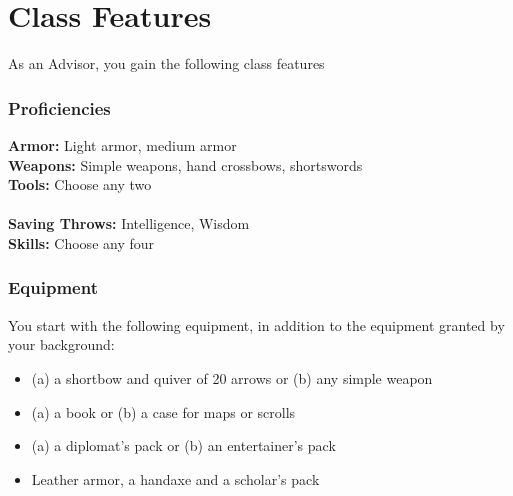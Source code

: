 \documentclass[letterpaper,openany,twoside,twocolumn]{book}
\begin{document}
	
	
	\section*{Class Features}
	As an Advisor, you gain the following class features
	
	
	\subsubsection*{Proficiencies}
	\textbf{Armor:} Light armor, medium armor\\
	\textbf{Weapons:} Simple weapons, hand crossbows, shortswords\\
	\textbf{Tools:} Choose any two\\\\
	\textbf{Saving Throws:} Intelligence, Wisdom\\
	\textbf{Skills:} Choose any four
	
	\subsubsection*{Equipment}
	You start with the following equipment, in addition to the equipment granted by your background:
	\begin{itemize}
		\item (a) a shortbow and quiver of 20 arrows or (b) any simple weapon
		\item (a) a book or (b) a case for maps or scrolls
		\item (a) a diplomat's pack or (b) an entertainer's pack
		\item Leather armor, a handaxe and a scholar's pack
	\end{itemize}
	
\end{document}
